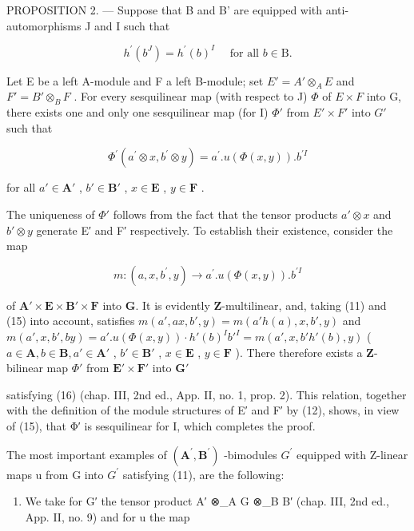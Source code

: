 PROPOSITION 2. --- Suppose that B and B' are equipped with anti-automorphisms J and I such that

\[
h ^ {\prime} (b ^ {J}) = h ^ {\prime} (b) ^ {I} \quad \text { for all } b \in \mathrm{B}.\tag{15}
\]

Let E be a left A-module and F a left B-module; set \(E' = A' \otimes_{A} E\) and \(F' = B' \otimes_{B} F\) . For every sesquilinear map (with respect to J) \(\Phi\) of \(E \times F\) into G, there exists one and only one sesquilinear map (for I) \(\Phi'\) from \(E' \times F'\) into \(G'\) such that

\[
\Phi^ {\prime} (a ^ {\prime} \otimes x, b ^ {\prime} \otimes y) = a ^ {\prime}. u (\Phi (x, y)). b ^ {\prime I}\tag{16}
\]

for all \(a' \in \mathbf{A}'\) , \(b' \in \mathbf{B}'\) , \(x \in \mathbf{E}\) , \(y \in \mathbf{F}\) .

The uniqueness of \(\Phi'\) follows from the fact that the tensor products \(a' \otimes x\) and \(b' \otimes y\) generate E′ and F′ respectively. To establish their existence, consider the map

\[
m: (a, x, b ^ {\prime}, y) \rightarrow a ^ {\prime}. u (\Phi (x, y)). b ^ {\prime I}
\]

of \(\mathbf{A}' \times \mathbf{E} \times \mathbf{B}' \times \mathbf{F}\) into \(\mathbf{G}\). It is evidently \(\mathbf{Z}\)-multilinear, and, taking (11) and (15) into account, satisfies \(m(a', ax, b', y) = m(a'h(a), x, b', y)\) and \(m(a', x, b', by) = a'. u(\Phi(x, y)) \cdot h'(b)^{I} b'^{I} = m(a', x, b'h'(b), y)\) ( \(a \in \mathbf{A}, b \in \mathbf{B}, a' \in \mathbf{A}'\) , \(b' \in \mathbf{B}'\) , \(x \in \mathbf{E}\) , \(y \in \mathbf{F}\) ). There therefore exists a \(\mathbf{Z}\)-bilinear map \(\Phi'\) from \(\mathbf{E}' \times \mathbf{F}'\) into \(\mathbf{G}'\)

satisfying (16) (chap. III, 2nd ed., App. II, no. 1, prop. 2). This relation, together with the definition of the module structures of E′ and F′ by (12), shows, in view of (15), that Φ′ is sesquilinear for I, which completes the proof.

The most important examples of \((\mathbf{A}^{\prime}, \mathbf{B}^{\prime})\) -bimodules \(G^{\prime}\) equipped with Z-linear maps u from G into \(G^{\prime}\) satisfying (11), are the following:

\begin{enumerate}
\def\labelenumi{\arabic{enumi})}
\tightlist
\item
  We take for G′ the tensor product A′ ⊗\_A G ⊗\_B B′ (chap. III, 2nd ed., App. II, no. 9) and for u the map
\end{enumerate}

